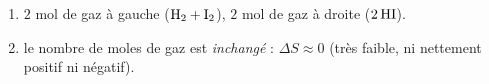 \documentclass[11pt,a4paper]{article}
\begin{document}
\begin{corrige}
\begin{enumerate}[label=\alph*)]
  \item $2$ mol de gaz à gauche ($\ce{H2}+\ce{I2}$), $2$ mol de gaz à droite ($2\,\ce{HI}$).
  \item le nombre de moles de gaz est \emph{inchangé} : $\Delta S\approx 0$ (très faible, ni nettement positif ni négatif).
\end{enumerate}
\end{corrige}
\end{document}
